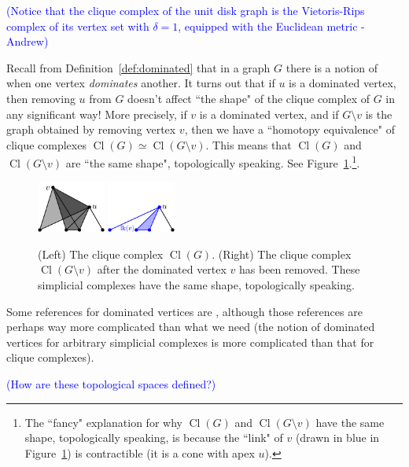 \documentclass[amscd, amssymb, verbatim]{amsart}[12pt]
\newcommand{\note}[1]{\textcolor{blue}{({#1})}}
\theoremstyle{plain}
\theoremstyle{definition}
\DeclareMathOperator{\cl}{Cl}
\begin{document}
\note{Notice that the clique complex of the unit disk graph is the Vietoris-Rips complex of its vertex set with $\delta = 1$, equipped with the Euclidean metric - Andrew}

Recall from Definition~\ref{def:dominated} that in a graph $G$ there is a notion of when one vertex \emph{dominates} another.
It turns out that if $u$ is a dominated vertex, then removing $u$ from $G$ doesn't affect ``the shape" of the clique complex of $G$ in any significant way!
More precisely, if $v$ is a dominated vertex, and if $G\setminus v$ is the graph obtained by removing vertex $v$, then we have a ``homotopy equivalence" of clique complexes $\cl(G)\simeq \cl(G\setminus v)$.
This means that $\cl(G)$ and $\cl(G\setminus v)$ are ``the same shape", topologically speaking.
See Figure~\ref{fig:dominatedClique}.\footnote{The ``fancy" explanation for why $\cl(G)$ and $\cl(G\setminus v)$ have the same shape, topologically speaking, is because the ``link" of $v$ (drawn in blue in Figure~\ref{fig:dominatedClique}) is contractible (it is a cone with apex $u$).}.

\begin{figure}[h]
\centering
\includegraphics[width=0.2\textwidth]{Dominated2_labeled.pdf}
\hspace{20mm}
\includegraphics[width=0.2\textwidth]{Dominated4_labeled.pdf}
\caption{(Left) The clique complex $\cl(G)$. (Right) The clique complex $\cl(G\setminus v)$ after the dominated vertex $v$ has been removed. These simplicial complexes have the same shape, topologically speaking.}
\label{fig:dominatedClique}
\end{figure}

Some references for dominated vertices are \cite{BabsonKozlov2006,barmak2012strong,Matouvsek2008}, although those references are perhaps way more complicated than what we need (the notion of dominated vertices for arbitrary simplicial complexes is more complicated than that for clique complexes).


\note{How are these topological spaces defined?}
\end{document}
